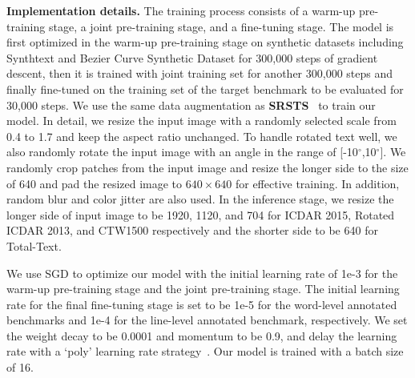 \smallskip\noindent\textbf{Implementation details.}
\label{sec:training}
The training process consists of a warm-up pre-training stage, a joint pre-training stage, and a fine-tuning stage. The model is first optimized in the warm-up pre-training stage on synthetic datasets including Synthtext and Bezier Curve Synthetic Dataset for 300,000 steps of gradient descent, then it is trained with joint training set for another 300,000 steps and finally fine-tuned on the training set of the target benchmark to be evaluated for 30,000 steps.  We use the same data augmentation as \textbf{SRSTS}~\cite{wu2022decoupling} to train our model. In detail, we resize the input image with a randomly selected scale from 0.4 to 1.7 and keep the aspect ratio unchanged.  To handle rotated text well, we also randomly rotate the input image with an angle in the range of [-10$^{\circ}$,10$^{\circ}$]. We randomly crop patches from the input image and resize the longer side to the size of 640 and pad the resized image to $640\times640$ for effective training. In addition, random blur and color jitter are also used. In the inference stage, we resize the longer side of input image to be 1920, 1120, and 704 for ICDAR 2015, Rotated ICDAR 2013, and CTW1500 respectively and the shorter side to be 640 for Total-Text.

We use SGD to optimize our model with the initial learning rate of 1e-3 for the warm-up pre-training stage and the joint pre-training stage. The initial learning rate for the final fine-tuning stage is set to be 1e-5 for the word-level annotated benchmarks and 1e-4 for the line-level annotated benchmark, respectively. We set the weight decay to be 0.0001 and momentum to be 0.9, and delay the learning rate with a `poly’ learning rate strategy~\cite{chen2017deeplab}. Our model is trained with a batch size of 16. 

